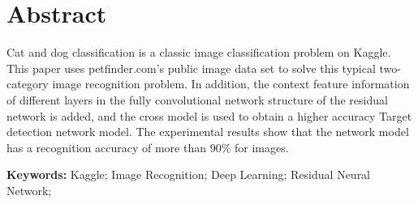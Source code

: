\chapter{Abstract}

Cat and dog classification is a classic image classification problem on Kaggle. This paper uses petfinder.com’s public image data set to solve this typical two-category image recognition problem. In addition, the context feature information of different layers in the fully convolutional network structure of the residual network is added, and the cross model is used to obtain a higher accuracy Target detection network model. The experimental results show that the network model has a recognition accuracy of more than 90\% for images.

{
    \vspace{1em}
    \setlength{\parindent}{0em}
    \textbf{Keywords: } \; Kaggle; \; Image Recognition; \; Deep Learning; \; Residual Neural Network; \par
}
